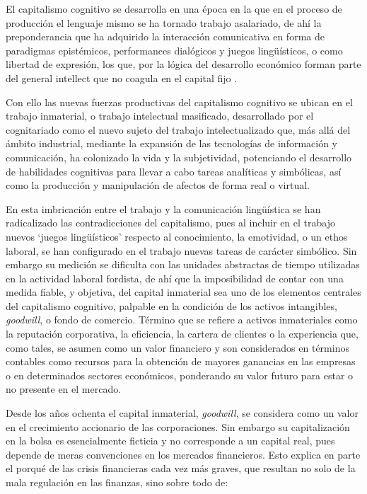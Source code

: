 \documentclass[
  spanish,
  11pt,
  a4paper,
]{scrbook}
\begin{document}
El capitalismo cognitivo se desarrolla en una época en la que en el
proceso de producción el lenguaje mismo se ha tornado trabajo
asalariado, de ahí la preponderancia que ha adquirido la interacción
comunicativa en forma de paradigmas epistémicos, performances dialógicos
y juegos lingüísticos, o como libertad de expresión, los que, por la
lógica del desarrollo económico forman parte del general intellect que
no coagula en el capital fijo \autocite[66]{Virno2003}.

Con ello las nuevas fuerzas productivas del capitalismo cognitivo se
ubican en el trabajo inmaterial, o trabajo intelectual masificado,
desarrollado por el cognitariado como el nuevo sujeto del trabajo
intelectualizado que, más allá del ámbito industrial, mediante la
expansión de las tecnologías de información y comunicación, ha
colonizado la vida y la subjetividad, potenciando el desarrollo de
habilidades cognitivas para llevar a cabo tareas analíticas y
simbólicas, así como la producción y manipulación de afectos de forma
real o virtual.

En esta imbricación entre el trabajo y la comunicación lingüística se
han radicalizado las contradicciones del capitalismo, pues al incluir en
el trabajo nuevos `juegos lingüísticos' respecto al conocimiento, la
emotividad, o un ethos laboral, se han configurado en el trabajo nuevas
tareas de carácter simbólico. Sin embargo su medición se dificulta con
las unidades abstractas de tiempo utilizadas en la actividad laboral
fordista, de ahí que la imposibilidad de contar con una medida fiable, y
objetiva, del capital inmaterial sea uno de los elementos centrales del
capitalismo cognitivo, palpable en la condición de los activos
intangibles, \emph{goodwill}, o fondo de comercio. Término que se
refiere a activos inmateriales como la reputación corporativa, la
eficiencia, la cartera de clientes o la experiencia que, como tales, se
asumen como un valor financiero y son considerados en términos contables
como recursos para la obtención de mayores ganancias en las empresas o
en determinados sectores económicos, ponderando su valor futuro para
estar o no presente en el mercado.

Desde los años ochenta el capital inmaterial, \emph{goodwill}, se
considera como un valor en el crecimiento accionario de las
corporaciones. Sin embargo su capitalización en la bolsa es
esencialmente ficticia y no corresponde a un capital real, pues depende
de meras convenciones en los mercados financieros. Esto explica en parte
el porqué de las crisis financieras cada vez más graves, que resultan no
solo de la mala regulación en las finanzas, sino sobre todo de:
\end{document}

